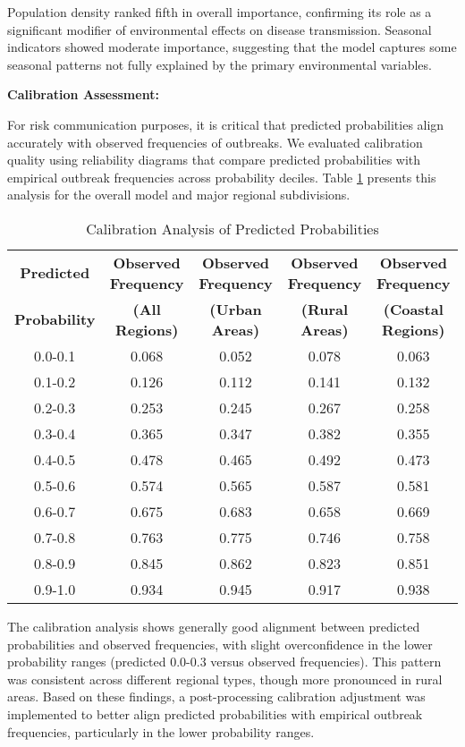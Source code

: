 \documentclass[12pt,a4paper]{report}
\begin{document}
Population density ranked fifth in overall importance, confirming its role as a significant modifier of environmental effects on disease transmission. Seasonal indicators showed moderate importance, suggesting that the model captures some seasonal patterns not fully explained by the primary environmental variables.

\textbf{Calibration Assessment:}

For risk communication purposes, it is critical that predicted probabilities align accurately with observed frequencies of outbreaks. We evaluated calibration quality using reliability diagrams that compare predicted probabilities with empirical outbreak frequencies across probability deciles. Table \ref{tab:calibration} presents this analysis for the overall model and major regional subdivisions.

\begin{table}[h]
\centering
\caption{Calibration Analysis of Predicted Probabilities}
\label{tab:calibration}
\begin{tabular}{@{}ccccc@{}}
\toprule
\textbf{Predicted} & \textbf{Observed Frequency} & \textbf{Observed Frequency} & \textbf{Observed Frequency} & \textbf{Observed Frequency} \\
\textbf{Probability} & \textbf{(All Regions)} & \textbf{(Urban Areas)} & \textbf{(Rural Areas)} & \textbf{(Coastal Regions)} \\
\midrule
0.0-0.1 & 0.068 & 0.052 & 0.078 & 0.063 \\
0.1-0.2 & 0.126 & 0.112 & 0.141 & 0.132 \\
0.2-0.3 & 0.253 & 0.245 & 0.267 & 0.258 \\
0.3-0.4 & 0.365 & 0.347 & 0.382 & 0.355 \\
0.4-0.5 & 0.478 & 0.465 & 0.492 & 0.473 \\
0.5-0.6 & 0.574 & 0.565 & 0.587 & 0.581 \\
0.6-0.7 & 0.675 & 0.683 & 0.658 & 0.669 \\
0.7-0.8 & 0.763 & 0.775 & 0.746 & 0.758 \\
0.8-0.9 & 0.845 & 0.862 & 0.823 & 0.851 \\
0.9-1.0 & 0.934 & 0.945 & 0.917 & 0.938 \\
\bottomrule
\end{tabular}
\end{table}

The calibration analysis shows generally good alignment between predicted probabilities and observed frequencies, with slight overconfidence in the lower probability ranges (predicted 0.0-0.3 versus observed frequencies). This pattern was consistent across different regional types, though more pronounced in rural areas. Based on these findings, a post-processing calibration adjustment was implemented to better align predicted probabilities with empirical outbreak frequencies, particularly in the lower probability ranges.
\end{document}
